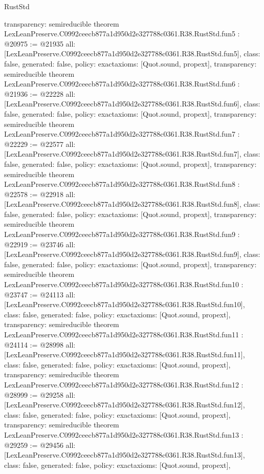 \begin{lexlean}{RustStd}
\begin{coremodule}
{  transparency: semireducible
}
theorem LexLeanPreserve.C0992ceecb877a1d950d2e327788c0361.R38.RustStd.fun5 : @20975 := @21935 {
  all: [LexLeanPreserve.C0992ceecb877a1d950d2e327788c0361.R38.RustStd.fun5],
  class: false,
  generated: false,
  policy: exact{axioms: [Quot.sound, propext]},
  transparency: semireducible
}
theorem LexLeanPreserve.C0992ceecb877a1d950d2e327788c0361.R38.RustStd.fun6 : @21936 := @22228 {
  all: [LexLeanPreserve.C0992ceecb877a1d950d2e327788c0361.R38.RustStd.fun6],
  class: false,
  generated: false,
  policy: exact{axioms: [Quot.sound, propext]},
  transparency: semireducible
}
theorem LexLeanPreserve.C0992ceecb877a1d950d2e327788c0361.R38.RustStd.fun7 : @22229 := @22577 {
  all: [LexLeanPreserve.C0992ceecb877a1d950d2e327788c0361.R38.RustStd.fun7],
  class: false,
  generated: false,
  policy: exact{axioms: [Quot.sound, propext]},
  transparency: semireducible
}
theorem LexLeanPreserve.C0992ceecb877a1d950d2e327788c0361.R38.RustStd.fun8 : @22578 := @22918 {
  all: [LexLeanPreserve.C0992ceecb877a1d950d2e327788c0361.R38.RustStd.fun8],
  class: false,
  generated: false,
  policy: exact{axioms: [Quot.sound, propext]},
  transparency: semireducible
}
theorem LexLeanPreserve.C0992ceecb877a1d950d2e327788c0361.R38.RustStd.fun9 : @22919 := @23746 {
  all: [LexLeanPreserve.C0992ceecb877a1d950d2e327788c0361.R38.RustStd.fun9],
  class: false,
  generated: false,
  policy: exact{axioms: [Quot.sound, propext]},
  transparency: semireducible
}
theorem LexLeanPreserve.C0992ceecb877a1d950d2e327788c0361.R38.RustStd.fun10 : @23747 := @24113 {
  all: [LexLeanPreserve.C0992ceecb877a1d950d2e327788c0361.R38.RustStd.fun10],
  class: false,
  generated: false,
  policy: exact{axioms: [Quot.sound, propext]},
  transparency: semireducible
}
theorem LexLeanPreserve.C0992ceecb877a1d950d2e327788c0361.R38.RustStd.fun11 : @24114 := @28998 {
  all: [LexLeanPreserve.C0992ceecb877a1d950d2e327788c0361.R38.RustStd.fun11],
  class: false,
  generated: false,
  policy: exact{axioms: [Quot.sound, propext]},
  transparency: semireducible
}
theorem LexLeanPreserve.C0992ceecb877a1d950d2e327788c0361.R38.RustStd.fun12 : @28999 := @29258 {
  all: [LexLeanPreserve.C0992ceecb877a1d950d2e327788c0361.R38.RustStd.fun12],
  class: false,
  generated: false,
  policy: exact{axioms: [Quot.sound, propext]},
  transparency: semireducible
}
theorem LexLeanPreserve.C0992ceecb877a1d950d2e327788c0361.R38.RustStd.fun13 : @29259 := @29456 {
  all: [LexLeanPreserve.C0992ceecb877a1d950d2e327788c0361.R38.RustStd.fun13],
  class: false,
  generated: false,
  policy: exact{axioms: [Quot.sound, propext]},
}
\end{coremodule}
\end{lexlean}
